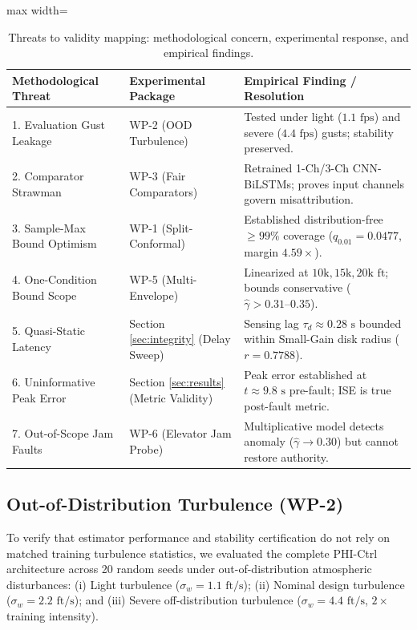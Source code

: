 \documentclass[review,12pt]{elsarticle}
\begin{document}
\begin{table}[!htbp]
\centering
\caption{Threats to validity mapping: methodological concern, experimental response, and empirical findings.}
\label{tab:threats_validity}
\scriptsize
\setlength{\tabcolsep}{3pt}
\begin{adjustbox}{max width=\textwidth}
\begin{tabular}{lll}
\toprule
Methodological Threat & Experimental Package & Empirical Finding / Resolution \\
\midrule
1. Evaluation Gust Leakage & WP-2 (OOD Turbulence) & Tested under light ($1.1\text{ fps}$) and severe ($4.4\text{ fps}$) gusts; stability preserved. \\
2. Comparator Strawman & WP-3 (Fair Comparators) & Retrained 1-Ch/3-Ch CNN-BiLSTMs; proves input channels govern misattribution. \\
3. Sample-Max Bound Optimism & WP-1 (Split-Conformal) & Established distribution-free $\ge 99\%$ coverage ($q_{0.01} = 0.0477$, margin $4.59\times$). \\
4. One-Condition Bound Scope & WP-5 (Multi-Envelope) & Linearized at $10\text{k}, 15\text{k}, 20\text{k}\text{ ft}$; bounds conservative ($\hat{\gamma} > 0.31\text{--}0.35$). \\
5. Quasi-Static Latency & Section \ref{sec:integrity} (Delay Sweep) & Sensing lag $\tau_d \approx 0.28\text{ s}$ bounded within Small-Gain disk radius ($r = 0.7788$). \\
6. Uninformative Peak Error & Section \ref{sec:results} (Metric Validity) & Peak error established at $t \approx 9.8\text{ s}$ pre-fault; ISE is true post-fault metric. \\
7. Out-of-Scope Jam Faults & WP-6 (Elevator Jam Probe) & Multiplicative model detects anomaly ($\hat{\gamma} \to 0.30$) but cannot restore authority. \\
\bottomrule
\end{tabular}
\end{adjustbox}
\end{table}

\subsection{Out-of-Distribution Turbulence (WP-2)}
\label{sec:wp2_turbulence}

To verify that estimator performance and stability certification do not rely on matched training turbulence statistics, we evaluated the complete PHI-Ctrl architecture across 20 random seeds under out-of-distribution atmospheric disturbances: (i) Light turbulence ($\sigma_w = 1.1\text{ ft/s}$); (ii) Nominal design turbulence ($\sigma_w = 2.2\text{ ft/s}$); and (iii) Severe off-distribution turbulence ($\sigma_w = 4.4\text{ ft/s}$, $2\times$ training intensity).
\end{document}
